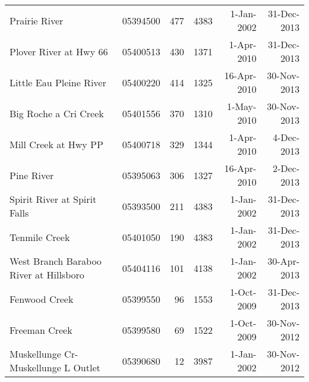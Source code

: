 \begin{table}[h]
\begin{tabular}{lrrrrr}
		Prairie River                          & 05394500                    & 477                                     & 4383                              & 1-Jan-2002                     & 31-Dec-2013                  \\
		Plover River at Hwy 66                 & 05400513                    & 430                                     & 1371                              & 1-Apr-2010                     & 31-Dec-2013                  \\
		Little Eau Pleine River                & 05400220                    & 414                                     & 1325                              & 16-Apr-2010                    & 30-Nov-2013                  \\
		Big Roche a Cri Creek                  & 05401556                    & 370                                     & 1310                              & 1-May-2010                     & 30-Nov-2013                  \\
		Mill  Creek at Hwy PP                  & 05400718                    & 329                                     & 1344                              & 1-Apr-2010                     & 4-Dec-2013                   \\
		Pine River                             & 05395063                    & 306                                     & 1327                              & 16-Apr-2010                    & 2-Dec-2013                   \\
		Spirit River at Spirit Falls           & 05393500                    & 211                                     & 4383                              & 1-Jan-2002                     & 31-Dec-2013                  \\
		Tenmile Creek                          & 05401050                    & 190                                     & 4383                              & 1-Jan-2002                     & 31-Dec-2013                  \\
		West Branch Baraboo River at Hillsboro & 05404116                    & 101                                     & 4138                              & 1-Jan-2002                     & 30-Apr-2013                  \\
		Fenwood Creek                          & 05399550                    & 96                                      & 1553                              & 1-Oct-2009                     & 31-Dec-2013                  \\
		Freeman Creek                          & 05399580                    & 69                                      & 1522                              & 1-Oct-2009                     & 30-Nov-2012                  \\
		Muskellunge Cr-Muskellunge L Outlet    & 05390680                    & 12                                      & 3987                              & 1-Jan-2002                     & 30-Nov-2012 \\
\hline                  
\end{tabular}
\label{tab:streamflow_calibration_sites}
\end{table}